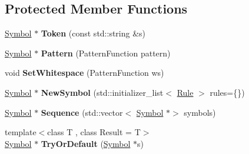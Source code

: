 \subsection*{Protected Member Functions}
\begin{DoxyCompactItemize}
\item 
\mbox{\label{classv8_1_1internal_1_1torque_1_1Grammar_a454021c6d9a324066f01c24e99f89488}} 
\mbox{\hyperlink{classv8_1_1internal_1_1torque_1_1Symbol}{Symbol}} $\ast$ {\bfseries Token} (const std\+::string \&s)
\item 
\mbox{\label{classv8_1_1internal_1_1torque_1_1Grammar_aa92a27b231b1e5f3e7314cbea0786420}} 
\mbox{\hyperlink{classv8_1_1internal_1_1torque_1_1Symbol}{Symbol}} $\ast$ {\bfseries Pattern} (Pattern\+Function pattern)
\item 
\mbox{\label{classv8_1_1internal_1_1torque_1_1Grammar_a3c7a9d96dc6baff9612eff658213fcb7}} 
void {\bfseries Set\+Whitespace} (Pattern\+Function ws)
\item 
\mbox{\label{classv8_1_1internal_1_1torque_1_1Grammar_a25319e13e6e56ccbe90d50477b38bf37}} 
\mbox{\hyperlink{classv8_1_1internal_1_1torque_1_1Symbol}{Symbol}} $\ast$ {\bfseries New\+Symbol} (std\+::initializer\+\_\+list$<$ \mbox{\hyperlink{classv8_1_1internal_1_1torque_1_1Rule}{Rule}} $>$ rules=\{\})
\item 
\mbox{\label{classv8_1_1internal_1_1torque_1_1Grammar_aa92695741b74f295ef303c15c4ec6e9f}} 
\mbox{\hyperlink{classv8_1_1internal_1_1torque_1_1Symbol}{Symbol}} $\ast$ {\bfseries Sequence} (std\+::vector$<$ \mbox{\hyperlink{classv8_1_1internal_1_1torque_1_1Symbol}{Symbol}} $\ast$$>$ symbols)
\item 
\mbox{\label{classv8_1_1internal_1_1torque_1_1Grammar_a76a8566abe0b2880dfac1299d69fff00}} 
{\footnotesize template$<$class T , class Result  = T$>$ }\\\mbox{\hyperlink{classv8_1_1internal_1_1torque_1_1Symbol}{Symbol}} $\ast$ {\bfseries Try\+Or\+Default} (\mbox{\hyperlink{classv8_1_1internal_1_1torque_1_1Symbol}{Symbol}} $\ast$s)
$$
\end{DoxyCompactItemize}
